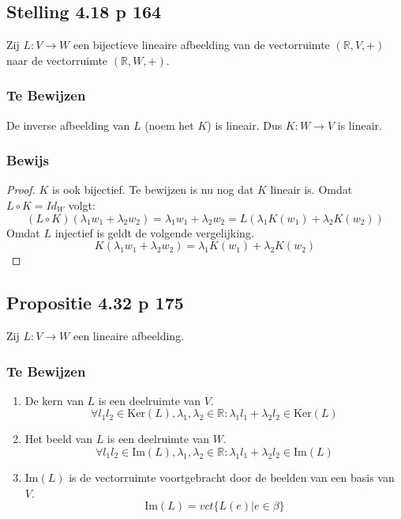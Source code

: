 \documentclass[lineaire_algebra_oplossingen.tex]{subfiles}
\begin{document}
\subsection{Stelling 4.18 p 164}
\label{4.18}
Zij $L:V\rightarrow W$ een bijectieve lineaire afbeelding van de vectorruimte $(\mathbb{R},V,+)$ naar de vectorruimte $(\mathbb{R},W,+)$.
\subsubsection*{Te Bewijzen}
De inverse afbeelding van $L$ (noem het $K$) is lineair. Dus $K : W \rightarrow V$ is lineair.
\subsubsection*{Bewijs}
\begin{proof}
$K$ is ook bijectief. Te bewijzen is nu nog dat $K$ lineair is. Omdat $L \circ K = \textit{Id}_W$ volgt:
\[
(L\circ K)(\lambda_1w_1 + \lambda_2w_2) = \lambda_1w_1 + \lambda_2w_2 = L(\lambda_1K(w_1) + \lambda_2K(w_2))
\]
Omdat $L$ injectief is geldt de volgende vergelijking.
\[
K(\lambda_1w_1 + \lambda_2w_2) = \lambda_1K(w_1) + \lambda_2K(w_2)
\]
\end{proof}

\subsection{Propositie 4.32 p 175}
\label{4.32}
Zij $L: V\rightarrow W$ een lineaire afbeelding.

\subsubsection*{Te Bewijzen}
\begin{enumerate}
\item De kern van $L$ is een deelruimte van $V$.
\[
\forall l_1l_2\in \text{Ker}(L), \lambda_1,\lambda_2\in \mathbb{R}: \lambda_1l_1+\lambda_2l_2 \in \text{Ker}(L)
\]

\item Het beeld van $L$ is een deelruimte van $W$.
\[
\forall l_1l_2\in \text{Im}(L), \lambda_1,\lambda_2\in \mathbb{R}: \lambda_1l_1+\lambda_2l_2 \in \text{Im}(L)
\]

\item $\text{Im}(L)$ is de vectorruimte voortgebracht door de beelden van een basis van $V$.
\[
\text{Im}(L) = vct\{L(e)|e\in \beta\}
\]
\end{enumerate}
\end{document}
